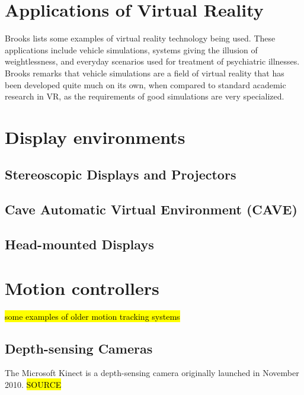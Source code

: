 \documentclass[12pt,a4paper,oneside,pdftex]{report}
\begin{document}
\section{Applications of Virtual Reality}
\label{section:applicationsofvr}

Brooks \cite{Brooks:1999:WRV:616061.618660} lists some examples of virtual reality technology being used. These applications include vehicle simulations, systems giving the illusion of weightlessness, and everyday scenarios used for treatment of psychiatric illnesses. Brooks remarks that vehicle simulations are a field of virtual reality that has been developed quite much on its own, when compared to standard academic research in VR, as the requirements of good simulations are very specialized.

\section{Display environments}
\label{section:displayenvironments}

\subsection{Stereoscopic Displays and Projectors}
\label{subsection:displayenvironments:stereoscopic}


\subsection{Cave Automatic Virtual Environment (CAVE)}
\label{subsection:displayenvironments:cave}

\subsection{Head-mounted Displays}
\label{subsection:displayenvironments:hmd}

\section{Motion controllers}
\label{section:motioncontrollers}

\hl{some examples of older motion tracking systems}


\subsection{Depth-sensing Cameras}
\label{subsection:motion:kinect}

The Microsoft Kinect is a depth-sensing camera originally launched in November 2010. \hl{SOURCE}
\end{document}
